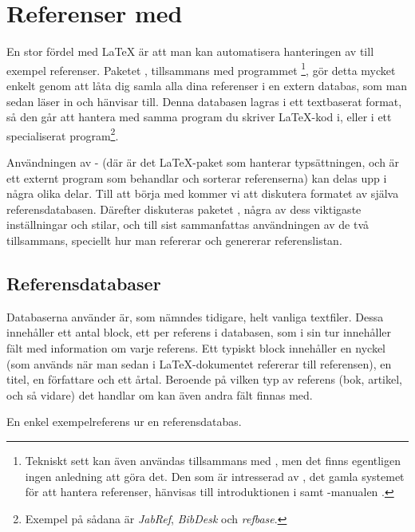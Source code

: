 \documentclass[lang=sv,ptsize=10pt,font=none,nomath,titles=bf,../../a4.tex]{subfiles}
\begin{document}
\section{Referenser med }\label{sec:5}
En stor fördel med \LaTeX{} är att man kan automatisera hanteringen av
till exempel referenser. Paketet , tillsammans med
programmet \footnote{Tekniskt sett kan även
\BibTeX{} användas tillsammans med , men det finns egentligen ingen anledning att göra det. Den som är intresserad av
\BibTeX{}, det gamla systemet för att hantera referenser, hänvisas till introduktionen i \textcite{Fenn06} samt \BibTeX{}-manualen
\parencite{Patashnik88a}.}, gör detta mycket enkelt genom att låta dig
samla alla dina referenser i en extern databas, som man sedan läser in
och hänvisar till. Denna databasen lagras i ett textbaserat format, så
den går att hantera med samma program du skriver \LaTeX-kod i, eller i
ett specialiserat program\footnote{Exempel på sådana är \emph{JabRef},
\emph{BibDesk} och \emph{refbase}.}.

Användningen av - (där  är det
\LaTeX-paket som hanterar typsättningen, och  är ett externt
program som behandlar och sorterar referenserna) kan delas upp i några
olika delar. Till att börja med kommer vi att diskutera formatet av
själva referensdatabasen. Därefter diskuteras paketet ,
några av dess viktigaste inställningar och stilar, och till sist
sammanfattas användningen av de två tillsammans, speciellt hur man
refererar och genererar referenslistan.

\cite{Lehman13} %
\cite{Kime13} %

\subsection{Referensdatabaser}
Databaserna  använder är, som nämndes tidigare, helt
vanliga textfiler. Dessa innehåller ett antal block, ett per referens
i databasen, som i sin tur innehåller fält med information om varje
referens. Ett typiskt block innehåller en nyckel (som används när man
sedan i \LaTeX-dokumentet refererar till referensen), en titel, en
författare och ett årtal. Beroende på vilken typ av referens (bok,
artikel, och så vidare) det handlar om kan även andra fält finnas med.

\begin{kod}[tbp]
	\centering
	\vfil\cprotect[mm]\vfil
	\caption{En enkel exempelreferens ur en referensdatabas.}
	\label{ex:bibtex}
\end{kod}
\end{document}

